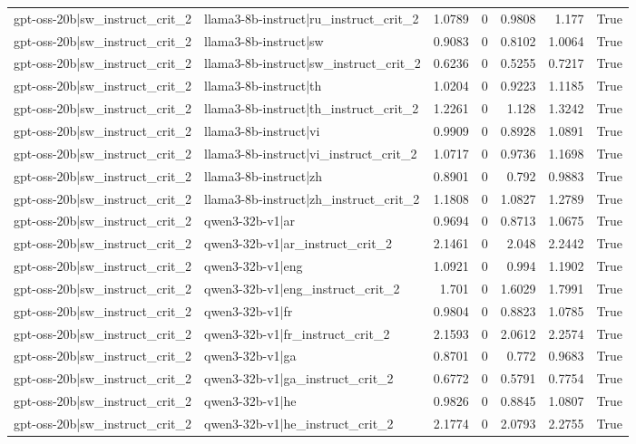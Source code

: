 \begin{table}
\begin{tabular}{l l r r r r l}
gpt-oss-20b|sw_instruct_crit_2 & llama3-8b-instruct|ru_instruct_crit_2 & 1.0789 & 0 & 0.9808 & 1.177 & True \\
gpt-oss-20b|sw_instruct_crit_2 & llama3-8b-instruct|sw & 0.9083 & 0 & 0.8102 & 1.0064 & True \\
gpt-oss-20b|sw_instruct_crit_2 & llama3-8b-instruct|sw_instruct_crit_2 & 0.6236 & 0 & 0.5255 & 0.7217 & True \\
gpt-oss-20b|sw_instruct_crit_2 & llama3-8b-instruct|th & 1.0204 & 0 & 0.9223 & 1.1185 & True \\
gpt-oss-20b|sw_instruct_crit_2 & llama3-8b-instruct|th_instruct_crit_2 & 1.2261 & 0 & 1.128 & 1.3242 & True \\
gpt-oss-20b|sw_instruct_crit_2 & llama3-8b-instruct|vi & 0.9909 & 0 & 0.8928 & 1.0891 & True \\
gpt-oss-20b|sw_instruct_crit_2 & llama3-8b-instruct|vi_instruct_crit_2 & 1.0717 & 0 & 0.9736 & 1.1698 & True \\
gpt-oss-20b|sw_instruct_crit_2 & llama3-8b-instruct|zh & 0.8901 & 0 & 0.792 & 0.9883 & True \\
gpt-oss-20b|sw_instruct_crit_2 & llama3-8b-instruct|zh_instruct_crit_2 & 1.1808 & 0 & 1.0827 & 1.2789 & True \\
gpt-oss-20b|sw_instruct_crit_2 & qwen3-32b-v1|ar & 0.9694 & 0 & 0.8713 & 1.0675 & True \\
gpt-oss-20b|sw_instruct_crit_2 & qwen3-32b-v1|ar_instruct_crit_2 & 2.1461 & 0 & 2.048 & 2.2442 & True \\
gpt-oss-20b|sw_instruct_crit_2 & qwen3-32b-v1|eng & 1.0921 & 0 & 0.994 & 1.1902 & True \\
gpt-oss-20b|sw_instruct_crit_2 & qwen3-32b-v1|eng_instruct_crit_2 & 1.701 & 0 & 1.6029 & 1.7991 & True \\
gpt-oss-20b|sw_instruct_crit_2 & qwen3-32b-v1|fr & 0.9804 & 0 & 0.8823 & 1.0785 & True \\
gpt-oss-20b|sw_instruct_crit_2 & qwen3-32b-v1|fr_instruct_crit_2 & 2.1593 & 0 & 2.0612 & 2.2574 & True \\
gpt-oss-20b|sw_instruct_crit_2 & qwen3-32b-v1|ga & 0.8701 & 0 & 0.772 & 0.9683 & True \\
gpt-oss-20b|sw_instruct_crit_2 & qwen3-32b-v1|ga_instruct_crit_2 & 0.6772 & 0 & 0.5791 & 0.7754 & True \\
gpt-oss-20b|sw_instruct_crit_2 & qwen3-32b-v1|he & 0.9826 & 0 & 0.8845 & 1.0807 & True \\
gpt-oss-20b|sw_instruct_crit_2 & qwen3-32b-v1|he_instruct_crit_2 & 2.1774 & 0 & 2.0793 & 2.2755 & True \\

\end{tabular}
\end{table}
